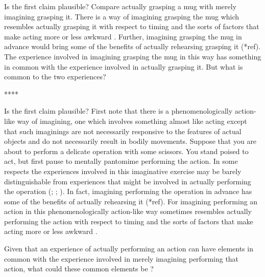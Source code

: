 \documentclass[12pt,\papersize]{extarticle}
\begin{document}
Is the first claim plausible?  Compare actually grasping a mug with merely imagining grasping it.  There is a way of imagining grasping the mug which resembles actually grasping it with respect to timing \citep{decety:1989_timing, decety:1996_imagined, Jeannerod:1994oz} and the sorts of factors that make acting more or less awkward \citep{parsons:1994_temporal, frak:2001_orientation}. Further, imagining grasping the mug in advance would bring some of the benefits of actually rehearsing grasping it (*ref). The experience involved in imagining grasping the mug in this way has something in common with the experience involved in actually grasping it.  But what is common to the two experiences?  

****

Is the first claim plausible?  First note that there is a phenomenologically action-like way of imagining, one which involves something almost like acting except that such imaginings are not necessarily responsive to the features of actual objects and do not necessarily result in bodily movements.  Suppose that you are about to perform a delicate operation with some scissors. You stand poised to act, but first pause to mentally pantomime performing the action. In some respects the experiences involved in this imaginative exercise may be barely distinguishable from experiences that might be involved in actually performing the operation (\citealp[p.\ 161]{currie:1997_mental}; \citealp[p.\ 727]{jeannerod:1995_mental}; \citealp[p.\ 638-9]{kosslyn:2001_neural}).  In fact, imagining performing the operation in advance has some of the benefits of actually rehearsing it (*ref).  For imagining performing an action in this phenomenologically action-like way sometimes resembles actually performing the action with respect to timing \citep{decety:1989_timing, decety:1996_imagined, Jeannerod:1994oz} and the sorts of factors that make acting more or less awkward \citep{parsons:1994_temporal, frak:2001_orientation}.  



Given that an experience of actually performing an action can have elements in common with the experience involved in merely imagining performing that action, what could these common elements be ?
\end{document}
